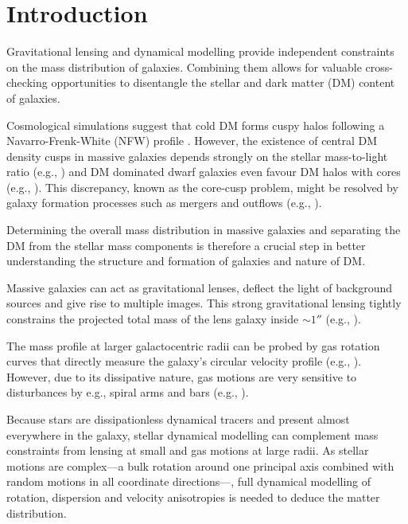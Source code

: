 \section{Introduction}

Gravitational lensing and dynamical modelling provide independent constraints on the mass distribution of galaxies. Combining them allows for valuable cross-checking opportunities to disentangle the stellar and dark matter (DM) content of galaxies.

Cosmological simulations suggest that cold DM forms cuspy halos following a Navarro-Frenk-White (NFW) profile \citep{NFW96}. However, the existence of central DM density cusps in massive galaxies depends strongly on the stellar mass-to-light ratio (e.g., \citealt{2011MNRAS.416..322D}) and DM dominated dwarf galaxies even favour DM halos with cores (e.g., \citealt{1994Natur.370..629M,2001ApJ...552L..23D}). This discrepancy, known as the core-cusp problem, might be resolved by galaxy formation processes such as mergers and outflows (e.g., \citealt{2001ApJ...560..636E,2012MNRAS.421.3464P}).

Determining the overall mass distribution in massive galaxies and separating the DM from the stellar mass components is therefore a crucial step in better understanding the structure and formation of galaxies and nature of DM.

Massive galaxies can act as gravitational lenses, deflect the light of background sources and give rise to multiple images. This strong gravitational lensing tightly constrains the projected total mass of the lens galaxy inside $\sim 1''$ (e.g., \citealt{2010ARA&A..48...87T}). 

The mass profile at larger galactocentric radii can be probed by gas rotation curves that directly measure the galaxy's circular velocity profile (e.g., \citealt{1980ApJ...238..471R}). However, due to its dissipative nature, gas motions are very sensitive to disturbances by e.g., spiral arms and bars (e.g., \citealt{2004dad..book.....S}). 

Because stars are dissipationless dynamical tracers and present almost everywhere in the galaxy, stellar dynamical modelling can complement mass constraints from lensing at small and gas motions at large radii. As stellar motions are complex---a bulk rotation around one principal axis combined with random motions in all coordinate directions---, full dynamical modelling of rotation, dispersion and velocity anisotropies is needed to deduce the matter distribution.

